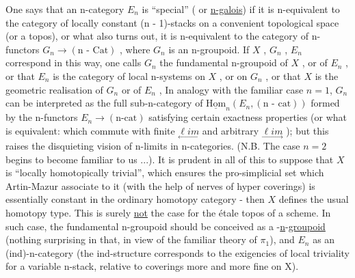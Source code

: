 
One says that an n-category $E_n$ is ``special'' ( or \uline{n-galois}) if
it is n-equivalent to the category of locally constant (n - 1)-stacks
on a convenient topological space (or a topos), or what also turns
out, it is n-equivalent to the category of n-functors
$G_n \to (\text{n - Cat})$ , where $G_n$ is an n-groupoid. If $X$ , $G_n$ , $E_n$
correspond in this way, one calls $G_n$ the fundamental n-groupoid
of $X$ , or of $E_n$ , or that $E_n$ is the category of local n-systems
on $X$ , or on $G_n$ , or that $X$ is the geometric realisation of
$G_n$ or of $E_n$ , In analogy with the familiar case $n = 1$, $G_n$
can be interpreted as the full sub-n-category of $\underline{\mathrm{Hom}}_n(E_n,(\text{n - cat}))$
formed by the n-functors $E_n \to (\text{n-cat})$ satisfying certain
exactness properties (or what is equivalent: which commute with
finite $\underset{\longleftarrow}{\ell im}$ and arbitrary $\underset{\longrightarrow}{\ell im}$ ); but this raises the disquieting
vision of n-limits in n-categories. (N.B. The case $n = 2$ begins
to become familiar to us ...). It is prudent in all of this to
suppose that $X$ is ``locally homotopically trivial'', which ensures
the pro-simplicial set which Artin-Mazur associate to it (with
the help of nerves of hyper coverings) is essentially constant in
the ordinary homotopy category - then $X$ defines the usual
homotopy type. This is surely \uline{not} the case for the étale topos
of a scheme. In such case, the fundamental n-groupoid should be
conceived as a -\uline{n}-\uline{groupoid} (nothing surprising in that, in view
of the familiar theory of $\pi_1$), and $E_n$ as an (ind)-n-category
(the ind-structure corresponds to the exigencies of local triviality
for a variable n-stack, relative to coverings more and more fine on
X).

